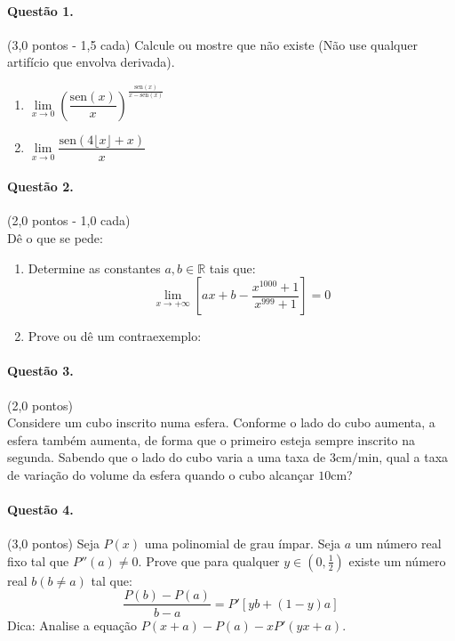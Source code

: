 \documentclass[12pt,a4paper]{article}
\newcommand{\sen}{\mathrm{sen}}
\begin{document}
\paragraph{Questão 1.} (3,0 pontos - 1,5 cada) Calcule ou mostre que não existe (Não use qualquer artifício que envolva derivada).
\begin{enumerate}[label = (\alph*)]
    \item $\lim \limits_{x \to 0} \left(\dfrac{\sen{(x)}}{x} \right)^{\frac{\sen{(x)}}{x - \sen{(x)}}} $
    \item $\lim \limits_{x \to 0} \dfrac{\sen{(4 \lfloor{x}\rfloor + x)}}{x}$ 
\end{enumerate}

\paragraph{Questão 2.} (2,0 pontos - 1,0 cada) \\
Dê o que se pede:
\begin{enumerate} [label = (\alph*)]
    \item Determine as constantes $a, b \in \mathbb{R}$ tais que: 
        \begin{equation*}
            \lim \limits_{x \to +\infty} \left[ax + b - \frac{x^{1000} + 1}{x^{999} + 1}\right] = 0 
        \end{equation*}
    \item Prove ou dê um contraexemplo:
    
\end{enumerate}

\paragraph{Questão 3.} (2,0 pontos) \\
Considere um cubo inscrito numa esfera. Conforme o lado do cubo aumenta, a esfera também aumenta, de forma que o primeiro esteja sempre inscrito na segunda. Sabendo que o lado do cubo varia a uma taxa de $3 \mathrm{cm/min}$, qual a taxa de variação do volume da esfera quando o cubo alcançar $10 \mathrm{cm}$?

\paragraph{Questão 4.} (3,0 pontos)
Seja $P(x)$ uma polinomial de grau ímpar. Seja $a$ um número real fixo tal que $P''(a) \neq 0$. Prove que para qualquer $y \in \left( 0, \frac{1}{2}\right)$ existe um número real $b \left( b \neq a\right)$ tal que:
    \begin{equation*}
        \frac{P(b) - P(a)}{b - a} = P'[yb + (1 -y)a]
    \end{equation*}
Dica: Analise a equação $P(x + a) - P(a) - xP'(yx + a)$.
\end{document}
